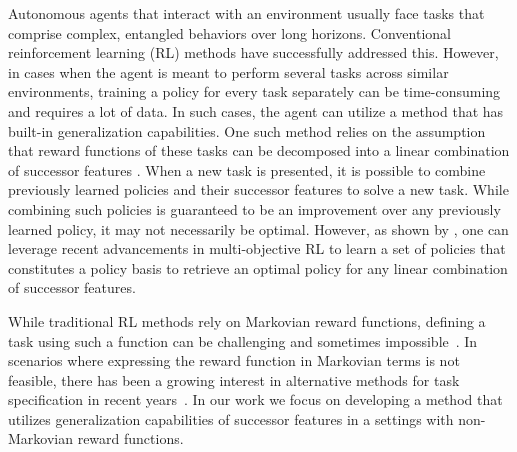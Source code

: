 Autonomous agents that interact with an environment usually face tasks  that comprise complex, entangled behaviors over long horizons. Conventional reinforcement learning (RL) methods have successfully addressed this.  However, in cases when the agent is meant to perform several tasks across similar environments, training a policy for every task separately can be time-consuming and requires a lot of data. In such cases, the agent can utilize a method that has built-in generalization capabilities. One such method relies on the assumption that reward functions of these tasks can be decomposed into a linear combination of successor features \cite{Barreto2017}. When a new task is presented, it is possible to combine previously learned policies and their successor features to solve a new task. %
While combining such policies is guaranteed to be an improvement over any previously learned policy, it may not necessarily be optimal. 
However, as shown by \citet{Alegre2022}, %
one can leverage recent advancements in multi-objective RL to learn a set of policies that constitutes a policy basis to retrieve an optimal policy for any linear combination of successor features. 

While traditional RL methods rely on Markovian reward functions, defining a task using such a function can be challenging and sometimes impossible~\cite{Whitehead1995}. In scenarios where expressing the reward function in Markovian terms is not feasible, there has been a growing interest in alternative methods for task specification in recent years~\citep{Icarte2018, Camacho2019}. 
In our work we focus on developing a method that utilizes generalization capabilities of successor features in a settings with non-Markovian reward functions.

